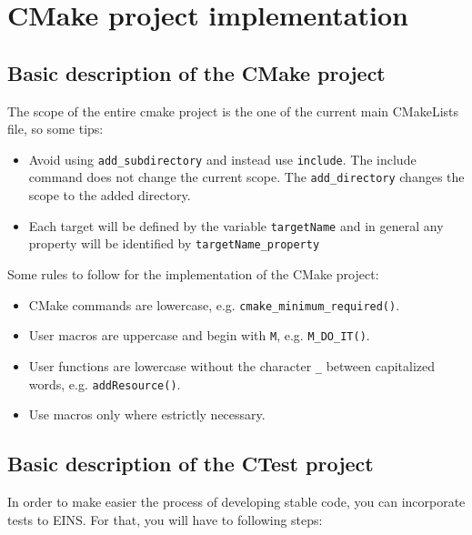 \documentclass[a4paper,11pt]{report}
\begin{document}
\chapter{CMake project implementation}

\section{Basic description of the CMake project}

The scope of the entire cmake project is the one of the current main
CMakeLists file, so some tips:

\begin{itemize}[noitemsep,topsep=2pt,parsep=2pt,partopsep=2pt]
\item Avoid using \verb!add_subdirectory! and instead use
  \verb!include!. The include command does not change the current
  scope. The \verb!add_directory! changes the scope to the added
  directory.
\item Each target will be defined by the variable \verb!targetName!
  and in general any property will be identified by
  \verb!targetName_property!
\end{itemize}

\noindent Some rules to follow for the implementation of the CMake project:

\begin{itemize}[noitemsep,topsep=2pt,parsep=2pt,partopsep=2pt]
\item CMake commands are lowercase, e.g. \verb!cmake_minimum_required()!.
\item User macros are uppercase and begin with \verb!M!, e.g. \verb!M_DO_IT()!.
\item User functions are lowercase without the character \verb!_! between
  capitalized words, e.g. \verb!addResource()!.
\item Use macros only where estrictly necessary.  
\end{itemize}

\section{Basic description of the CTest project}

In order to make easier the process of developing stable code, you can
incorporate tests to EINS. For that, you will have to following steps:
\end{document}
